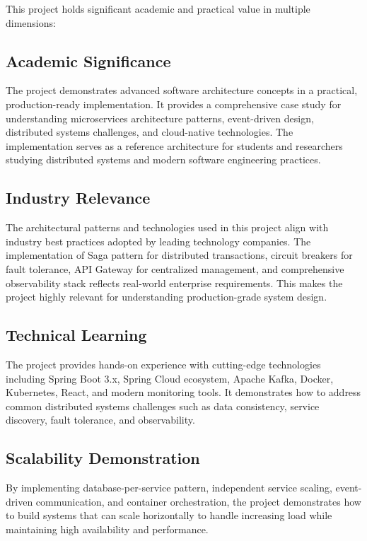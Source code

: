 This project holds significant academic and practical value in multiple dimensions:

\subsection{Academic Significance}

The project demonstrates advanced software architecture concepts in a practical, production-ready implementation. It provides a comprehensive case study for understanding microservices architecture patterns, event-driven design, distributed systems challenges, and cloud-native technologies. The implementation serves as a reference architecture for students and researchers studying distributed systems and modern software engineering practices.

\subsection{Industry Relevance}

The architectural patterns and technologies used in this project align with industry best practices adopted by leading technology companies. The implementation of Saga pattern for distributed transactions, circuit breakers for fault tolerance, API Gateway for centralized management, and comprehensive observability stack reflects real-world enterprise requirements. This makes the project highly relevant for understanding production-grade system design.

\subsection{Technical Learning}

The project provides hands-on experience with cutting-edge technologies including Spring Boot 3.x, Spring Cloud ecosystem, Apache Kafka, Docker, Kubernetes, React, and modern monitoring tools. It demonstrates how to address common distributed systems challenges such as data consistency, service discovery, fault tolerance, and observability.

\subsection{Scalability Demonstration}

By implementing database-per-service pattern, independent service scaling, event-driven communication, and container orchestration, the project demonstrates how to build systems that can scale horizontally to handle increasing load while maintaining high availability and performance.

